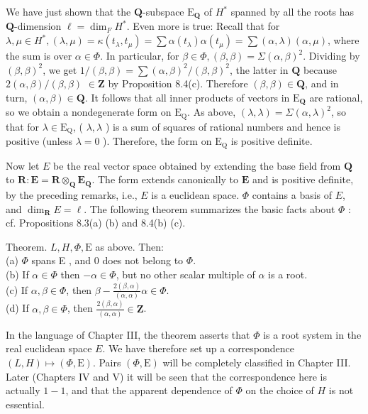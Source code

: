 \documentclass[10pt]{article}
\begin{document}
We have just shown that the $\mathbf{Q}$-subspace $\mathrm{E}_{\mathbf{Q}}$ of $H^{*}$ spanned by all the roots has $\mathbf{Q}$-dimension $\ell=\operatorname{dim}_{F} H^{*}$. Even more is true: Recall that for $\lambda, \mu \in H^{*},(\lambda, \mu)=\kappa\left(t_{\lambda}, t_{\mu}\right)=\sum \alpha\left(t_{\lambda}\right) \alpha\left(t_{\mu}\right)=\sum(\alpha, \lambda)(\alpha, \mu)$, where the sum is over $\alpha \in \Phi$. In particular, for $\beta \in \Phi,(\beta, \beta)=\Sigma(\alpha, \beta)^{2}$. Dividing by $(\beta, \beta)^{2}$, we get $1 /(\beta, \beta)=\sum(\alpha, \beta)^{2} /(\beta, \beta)^{2}$, the latter in $\mathbf{Q}$ because $2(\alpha, \beta) /(\beta, \beta)$ $\in \mathbf{Z}$ by Proposition 8.4(c). Therefore $(\beta, \beta) \in \mathbf{Q}$, and in turn, $(\alpha, \beta) \in \mathbf{Q}$. It follows that all inner products of vectors in $\mathrm{E}_{\mathbf{Q}}$ are rational, so we obtain a nondegenerate form on $\mathrm{E}_{\mathrm{Q}}$. As above, $(\lambda, \lambda)=\Sigma(\alpha, \lambda)^{2}$, so that for $\lambda \in \mathrm{E}_{\mathrm{Q}}$, ( $\lambda, \lambda$ ) is a sum of squares of rational numbers and hence is positive (unless $\lambda=0$ ). Therefore, the form on $\mathrm{E}_{\mathrm{Q}}$ is positive definite.

Now let $E$ be the real vector space obtained by extending the base field from $\mathbf{Q}$ to $\mathbf{R}: \mathbf{E}=\mathbf{R} \otimes_{\mathbf{Q}} \mathbf{E}_{\mathbf{Q}}$. The form extends canonically to $\mathbf{E}$ and is positive definite, by the preceding remarks, i.e., $E$ is a euclidean space. $\Phi$ contains a basis of $E$, and $\operatorname{dim}_{\mathbf{R}} E=\ell$. The following theorem summarizes the basic facts about $\Phi$ : cf. Propositions 8.3(a) (b) and 8.4(b) (c).

Theorem. $L, H, \Phi, \mathrm{E}$ as above. Then:\\
(a) $\Phi$ spans E , and 0 does not belong to $\Phi$.\\
(b) If $\alpha \in \Phi$ then $-\alpha \in \Phi$, but no other scalar multiple of $\alpha$ is a root.\\
(c) If $\alpha, \beta \in \Phi$, then $\beta-\frac{2(\beta, \alpha)}{(\alpha, \alpha)} \alpha \in \Phi$.\\
(d) If $\alpha, \beta \in \Phi$, then $\frac{2(\beta, \alpha)}{(\alpha, \alpha)} \in \mathbf{Z}$.

In the language of Chapter III, the theorem asserts that $\Phi$ is a root system in the real euclidean space $E$. We have therefore set up a correspondence $(L, H) \mapsto(\Phi, \mathrm{E})$. Pairs $(\Phi, \mathrm{E})$ will be completely classified in Chapter III. Later (Chapters IV and V) it will be seen that the correspondence here is actually $1-1$, and that the apparent dependence of $\Phi$ on the choice of $H$ is not essential.
\end{document}
